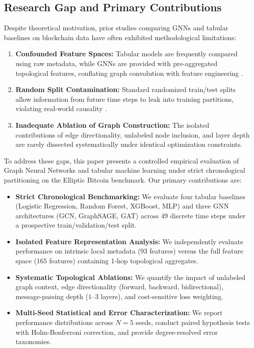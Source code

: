 \documentclass[conference]{IEEEtran}
\begin{document}
\subsection{Research Gap and Primary Contributions}
Despite theoretical motivation, prior studies comparing GNNs and tabular baselines on blockchain data have often exhibited methodological limitations:
\begin{enumerate}
    \item \textbf{Confounded Feature Spaces:} Tabular models are frequently compared using raw metadata, while GNNs are provided with pre-aggregated topological features, conflating graph convolution with feature engineering \cite{grinsztajn2022why, shwartz2022tabular}.
    \item \textbf{Random Split Contamination:} Standard randomized train/test splits allow information from future time steps to leak into training partitions, violating real-world causality \cite{errica2020fair, arp2022dos}.
    \item \textbf{Inadequate Ablation of Graph Construction:} The isolated contributions of edge directionality, unlabeled node inclusion, and layer depth are rarely dissected systematically under identical optimization constraints.
\end{enumerate}

To address these gaps, this paper presents a controlled empirical evaluation of Graph Neural Networks and tabular machine learning under strict chronological partitioning on the Elliptic Bitcoin benchmark. Our primary contributions are:
\begin{itemize}
    \item \textbf{Strict Chronological Benchmarking:} We evaluate four tabular baselines (Logistic Regression, Random Forest, XGBoost, MLP) and three GNN architectures (GCN, GraphSAGE, GAT) across 49 discrete time steps under a prospective train/validation/test split.
    \item \textbf{Isolated Feature Representation Analysis:} We independently evaluate performance on intrinsic local metadata ($93$ features) versus the full feature space ($165$ features) containing 1-hop topological aggregates.
    \item \textbf{Systematic Topological Ablations:} We quantify the impact of unlabeled graph context, edge directionality (forward, backward, bidirectional), message-passing depth ($1$--$3$ layers), and cost-sensitive loss weighting.
    \item \textbf{Multi-Seed Statistical and Error Characterization:} We report performance distributions across $N = 5$ seeds, conduct paired hypothesis tests with Holm-Bonferroni correction, and provide degree-resolved error taxonomies.
\end{itemize}
\end{document}
